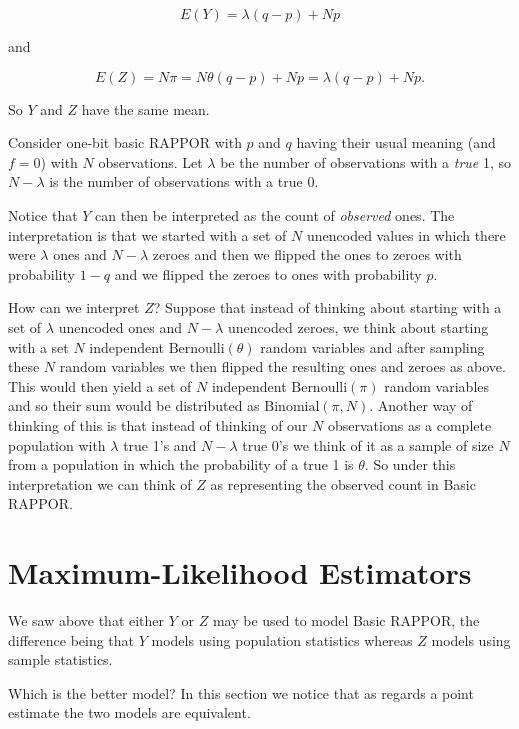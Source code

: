 \documentclass[oneside,12pt]{amsart}
\begin{document}
$$E(Y) = \lambda (q - p) + N p$$

and

$$E(Z) = N\pi = N\theta(q-p) + N p = \lambda (q - p) + N p.$$

So $Y$ and $Z$ have the same mean.

Consider one-bit basic RAPPOR with $p$ and $q$ having their usual meaning
(and $f=0$) with $N$ observations.
Let $\lambda$ be the number of observations with a \emph{true} 1, so
$N - \lambda$ is the number of observations with a true 0.

Notice that $Y$ can then be interpreted as the count of \emph{observed} ones.
The interpretation is that we started with a set of $N$ unencoded values in
which there were $\lambda$ ones and $N - \lambda$ zeroes and then we flipped
the ones to zeroes with probability $1 - q$ and we flipped the zeroes to ones
with probability $p$.

How can we interpret $Z$? Suppose that instead of thinking about starting with
a set of $\lambda$ unencoded ones and $N-\lambda$ unencoded zeroes,
we think about starting with a set $N$ independent $\text{Bernoulli}(\theta)$ random variables and after
sampling these $N$ random variables we then flipped the resulting ones and
zeroes as above.
This would then yield a set of $N$ independent $\text{Bernoulli}(\pi)$ random
variables and so their sum would be distributed as $\text{Binomial}(\pi, N)$.
Another way of thinking of this is that instead of thinking of our $N$ observations
as a complete population with $\lambda$ true 1's and $N-\lambda$ true 0's
we think of it as a sample of size $N$ from a population
in which the probability of a true 1 is $\theta$.
So under this interpretation we can think of $Z$ as representing the observed
count in Basic RAPPOR.


\section{Maximum-Likelihood Estimators}

We saw above that either $Y$ or $Z$ may be used to model Basic RAPPOR, the
difference being that $Y$ models using population statistics whereas $Z$
models using sample statistics.

Which is the better model? In this section we notice that as regards a point estimate
the two models are equivalent.
\end{document}
